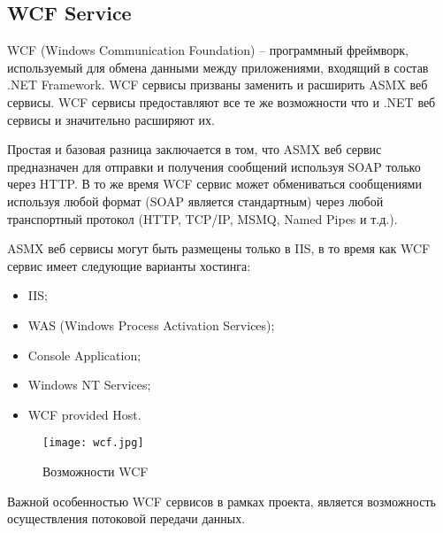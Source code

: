 \subsection{WCF Service}

WCF (Windows Communication Foundation) – программный фреймворк, используемый для обмена данными между приложениями, входящий в состав .NET Framework. WCF сервисы призваны заменить и расширить ASMX веб сервисы. WCF сервисы предоставляют все те же возможности что и .NET веб сервисы и значительно расширяют их.

Простая и базовая разница заключается в том, что ASMX веб сервис предназначен для отправки и получения сообщений используя SOAP только через HTTP. В то же время WCF сервис может обмениваться сообщениями используя любой формат (SOAP является стандартным) через любой транспортный протокол (HTTP, TCP/IP, MSMQ, Named Pipes и т.д.).

ASMX веб сервисы могут быть размещены только в IIS, в то время как WCF сервис имеет следующие варианты хостинга:
\begin{itemize}
	\item IIS;
	\item WAS (Windows Process Activation Services);
	\item Console Application;
	\item Windows NT Services;
	\item WCF provided Host.
\end{itemize}

\begin{figure}[h!]
\centering
	\texttt{[image: wcf.jpg]}
	\caption{Возможности WCF}
\end{figure}

Важной особенностью WCF сервисов в рамках проекта, является возможность осуществления потоковой передачи данных.
